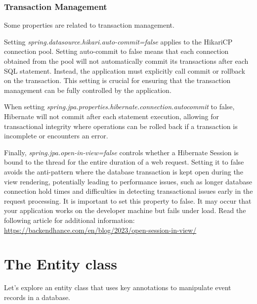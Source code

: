 \subsubsection{Transaction Management}

Some properties are related to transaction management. 

Setting \textit{spring.datasource.hikari.auto-commit=false} applies to the HikariCP connection pool. Setting auto-commit to false means that each connection obtained from the pool will not automatically commit its transactions after each SQL statement. Instead, the application must explicitly call commit or rollback on the transaction. This setting is crucial for ensuring that the transaction management can be fully controlled by the application.

When setting \textit{spring.jpa.properties.hibernate.connection.autocommit} to false, Hibernate will not commit after each statement execution, allowing for transactional integrity where operations can be rolled back if a transaction is incomplete or encounters an error.

Finally, \textit{spring.jpa.open-in-view=false} controls whether a Hibernate Session is bound to the thread for the entire duration of a web request. Setting it to false avoids the anti-pattern where the database transaction is kept open during the view rendering, potentially leading to performance issues, such as longer database connection hold times and difficulties in detecting transactional issues early in the request processing. It is important to set this property to false. It may occur that your application works on the developer machine but fails under load.
Read the following article for additional information:
\url{https://backendhance.com/en/blog/2023/open-session-in-view/}


\section{The Entity class}

Let's explore an entity class that uses key annotations to manipulate event records in a database.

